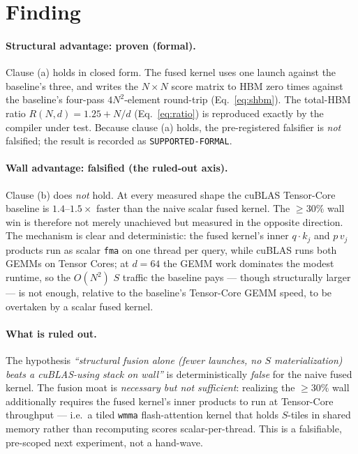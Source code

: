 \documentclass[11pt,a4paper]{article}
\newcommand{\verdict}[1]{\texttt{#1}}
\begin{document}
\section{Finding}
\label{sec:finding}

\paragraph{Structural advantage: proven (formal).}
Clause (a) holds in closed form. The fused kernel uses one launch against the
baseline's three, and writes the $N\times N$ score matrix to HBM zero times
against the baseline's four-pass $4N^2$-element round-trip
(Eq.~\eqref{eq:shbm}). The total-HBM ratio $R(N,d)=1.25+N/d$
(Eq.~\eqref{eq:ratio}) is reproduced exactly by the compiler under test. Because
clause (a) holds, the pre-registered falsifier is \emph{not} falsified; the
result is recorded as \verdict{\textcolor{blue!60!black}{SUPPORTED-FORMAL}}.

\paragraph{Wall advantage: falsified (the ruled-out axis).}
Clause (b) does \emph{not} hold. At every measured shape the cuBLAS Tensor-Core
baseline is $1.4$--$1.5\times$ faster than the naive scalar fused kernel. The
$\geq 30\%$ wall win is therefore not merely unachieved but measured in the
opposite direction. The mechanism is clear and deterministic: the fused kernel's
inner $q\cdot k_j$ and $p\,v_j$ products run as scalar \verdict{fma} on one
thread per query, while cuBLAS runs both GEMMs on Tensor Cores; at $d{=}64$ the
GEMM work dominates the modest runtime, so the $O(N^2)$ $S$ traffic the baseline
pays --- though structurally larger --- is not enough, relative to the
baseline's Tensor-Core GEMM speed, to be overtaken by a scalar fused kernel.

\paragraph{What is ruled out.}
The hypothesis \emph{``structural fusion alone (fewer launches, no $S$
materialization) beats a cuBLAS-using stack on wall''} is deterministically
\emph{false} for the naive fused kernel. The fusion moat is \emph{necessary but
not sufficient}: realizing the $\geq 30\%$ wall additionally requires the fused
kernel's inner products to run at Tensor-Core throughput --- i.e.\ a tiled
\verdict{wmma} flash-attention kernel that holds $S$-tiles in shared memory
rather than recomputing scores scalar-per-thread. This is a falsifiable,
pre-scoped next experiment, not a hand-wave.
\end{document}
